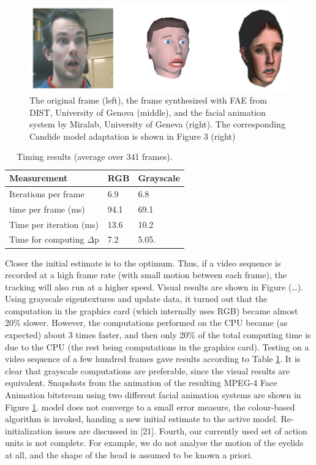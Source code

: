 \documentclass[12pt]{acmart}
\begin{document}
\begin{spacing}{2}
\begin{figure}[H]
    \centering
    \includegraphics[width=120mm]{Figure2.jpg}
    \caption{The original frame (left), the frame synthesized with FAE from DIST, University of Genova (middle), and the facial animation system by Miralab, University of Geneva (right). The corresponding Candide model adaptation is shown in Figure 3 (right)}
    \label{fig2}
\end{figure}

\begin{table}[H]
\caption{Timing results (average over 341 frames).} 
\label{tab1}
\begin{center}       
\begin{tabular}{|l|l|l|} 
\hline
\rule[-1ex]{0pt}{3.5ex}  Measurement & RGB & Grayscale \\
\hline\hline
\rule[-1ex]{0pt}{3.5ex}  Iterations per frame & 6.9 & 6.8  \\
\hline
\rule[-1ex]{0pt}{3.5ex} time per frame (ms) & 94.1 & 69.1 \\
\hline
\rule[-1ex]{0pt}{3.5ex}  Time per iteration (ms) & 13.6 & 10.2   \\
\hline
\rule[-1ex]{0pt}{3.5ex} Time for computing $\Delta$p & 7.2 & 5.05. \\
\hline 
\end{tabular}
\end{center}
\end{table}
Closer the initial estimate is to the optimum. Thus, if a video sequence is recorded at a high frame rate (with small motion between each frame), the tracking will also run at a higher speed. Visual results are shown in Figure (…). Using grayscale eigentextures and update data, it turned out that the computation in the graphics card (which internally uses RGB) became almost 20\% slower. However, the computations performed on the CPU became (as expected) about 3 times faster, and then only 20\% of the total computing time is due to the CPU (the rest being computations in the graphics card). Testing on a video sequence of a few hundred frames gave results according to Table \ref{tab1}. It is clear that grayscale computations are preferable, since the visual results are equivalent. Snapshots from the animation of the resulting MPEG-4 Face Animation bitstream using two different facial animation systems are shown in Figure \ref{fig2}. model does not converge to a small error measure, the colour-based algorithm is invoked, handing a new initial estimate to the active model. Re-initialization issues are discussed in [21]. Fourth, our currently used set of action units is not complete. For example, we do not analyse the motion of the eyelids at all, and the shape of the head is assumed to be known a priori.
\end{spacing}
\end{document}
